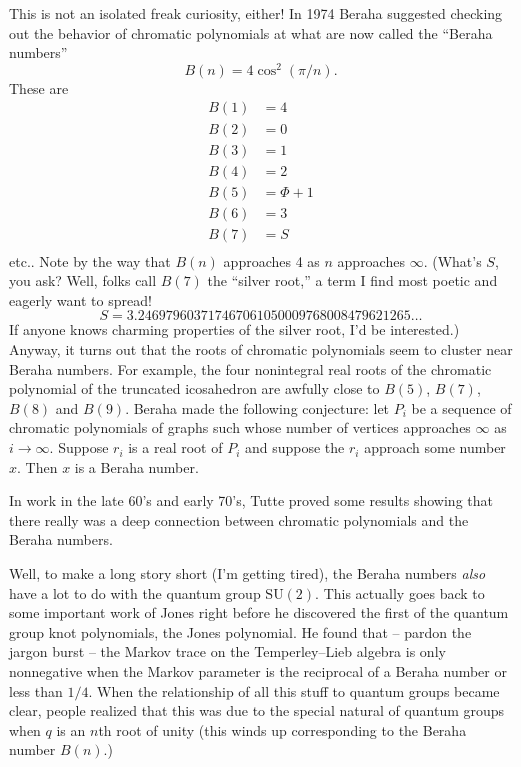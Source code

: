 \documentclass{article}
\begin{document}
This is not an isolated freak curiosity, either! In 1974 Beraha
suggested checking out the behavior of chromatic polynomials at what are
now called the ``Beraha numbers'' \[B(n) = 4 \cos^2(\pi/n).\] These are
\[\begin{aligned}B(1) &= 4 \\ B(2) &= 0 \\ B(3) &= 1 \\ B(4) &= 2 \\ B(5) &= \Phi+1 \\ B(6) &= 3 \\ B(7) &= S \\ \end{aligned}\]
etc.. Note by the way that \(B(n)\) approaches 4 as \(n\) approaches
\(\infty\). (What's \(S\), you ask? Well, folks call \(B(7)\) the
``silver root,'' a term I find most poetic and eagerly want to spread!
\[S =  3.246979603717467061050009768008479621265\ldots\] If anyone knows
charming properties of the silver root, I'd be interested.) Anyway, it
turns out that the roots of chromatic polynomials seem to cluster near
Beraha numbers. For example, the four nonintegral real roots of the
chromatic polynomial of the truncated icosahedron are awfully close to
\(B(5)\), \(B(7)\), \(B(8)\) and \(B(9)\). Beraha made the following
conjecture: let \(P_i\) be a sequence of chromatic polynomials of graphs
such whose number of vertices approaches \(\infty\) as \(i\to\infty\).
Suppose \(r_i\) is a real root of \(P_i\) and suppose the \(r_i\)
approach some number \(x\). Then \(x\) is a Beraha number.

In work in the late 60's and early 70's, Tutte proved some results
showing that there really was a deep connection between chromatic
polynomials and the Beraha numbers.

Well, to make a long story short (I'm getting tired), the Beraha numbers
\emph{also} have a lot to do with the quantum group \(\mathrm{SU}(2)\).
This actually goes back to some important work of Jones right before he
discovered the first of the quantum group knot polynomials, the Jones
polynomial. He found that -- pardon the jargon burst -- the Markov trace
on the Temperley--Lieb algebra is only nonnegative when the Markov
parameter is the reciprocal of a Beraha number or less than \(1/4\).
When the relationship of all this stuff to quantum groups became clear,
people realized that this was due to the special natural of quantum
groups when \(q\) is an \(n\)th root of unity (this winds up
corresponding to the Beraha number \(B(n)\).)
\end{document}
